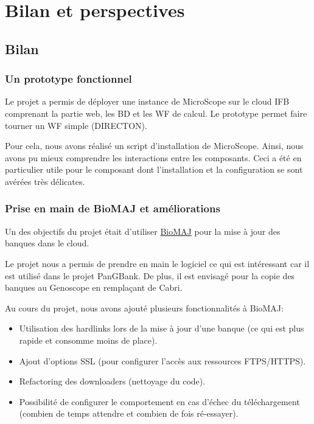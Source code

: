 \chapter{Bilan et perspectives}

\section{Bilan}

\subsection{Un prototype fonctionnel}

Le projet a permis de déployer une instance de MicroScope sur le cloud IFB
comprenant la partie web, les BD et les WF de calcul.
Le prototype permet faire tourner un WF simple (DIRECTON).

Pour cela, nous avons réalisé un script d'installation de MicroScope.
Ainsi, nous avons pu mieux comprendre les interactions entre les composants.
Ceci a été en particulier utile pour le composant  dont l'installation et la configuration
se sont avérées très délicates.


\subsection{Prise en main de BioMAJ et améliorations}

Un des objectifs du projet était d'utiliser \href{https://biomaj.genouest.org/}{BioMAJ}
pour la mise à jour des banques dans le cloud.

Le projet nous a permis de prendre en main le logiciel ce qui est intéressant car
il est utilisé dans le projet PanGBank.
De plus, il est envisagé pour la copie des banques au Genoscope en remplaçant de Cabri.

Au cours du projet, nous avons ajouté plusieurs fonctionnalités à BioMAJ:
\begin{itemize}
	\item Utilisation des hardlinks lors de la mise à jour d'une banque (ce qui est plus rapide et consomme moins de place).
	\item Ajout d'options SSL (pour configurer l'accès aux ressources FTPS/HTTPS).
	\item Refactoring des downloaders (nettoyage du code).
	\item Possibilité de configurer le comportement en cas d'échec du téléchargement (combien de temps attendre et combien de fois ré-essayer).
\end{itemize}

